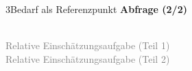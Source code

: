 \documentclass[xcolor=table,9pt,aspectratio=169]{beamer}
\begin{document}
\begin{frame}{\vspace*{10mm}3\hspace*{1em}Bedarf als Referenzpunkt}
\textbf{Abfrage (2/2)}\\
\begin{multicols}{2}
   \begin{center}
      \\
      \textcolor{gray}{Relative Einschätzungsaufgabe (Teil 1)}
      \\
      \textcolor{gray}{Relative Einschätzungsaufgabe (Teil 2)}
   \end{center}
\end{multicols}
\end{frame}
\end{document}
